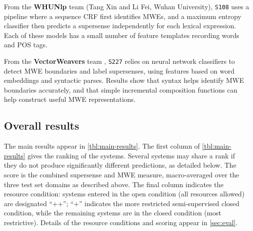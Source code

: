 \documentclass[11pt,letterpaper]{article}
\newcommand{\sys}[1]{\mbox{\texttt{#1}}}   %
\begin{document}
From the \textbf{WHUNlp} team (Tang Xin and Li Fei, Wuhan University),
\sys{S108} uses a pipeline where a sequence CRF first identifies MWEs, 
and a maximum entropy classifier then predicts a supersense independently 
for each lexical expression. Each of these models has a small number of feature templates 
recording words and POS tags.

From the \textbf{VectorWeavers} team \citep{dimsum-16-vector},
\sys{S227} relies on neural network classifiers to detect MWE boundaries and label supersenses, 
using features based on word embeddings and syntactic parses. 
Results show that syntax helps identify MWE boundaries accurately, and that 
simple incremental composition functions can help construct useful MWE representations.


\subsection{Overall results}\label{sec:overall}
The main results appear in \cref{tbl:main-results}. 
The first column of \cref{tbl:main-results} gives the ranking of the systems. 
Several systems may share a rank if they do not produce significantly different predictions, as detailed below. 
The score is the combined supersense and MWE measure, macro-averaged over the three test set domains 
as described above. 
The final column indicates the resource condition:
systems entered in the open condition (all resources allowed) are designated ``++''; 
``+'' indicates the more restricted semi-supervised closed condition,  
while the remaining systems are in the closed condition (most restrictive). 
Details of the resource conditions and scoring appear in \cref{sec:eval}.
\end{document}
